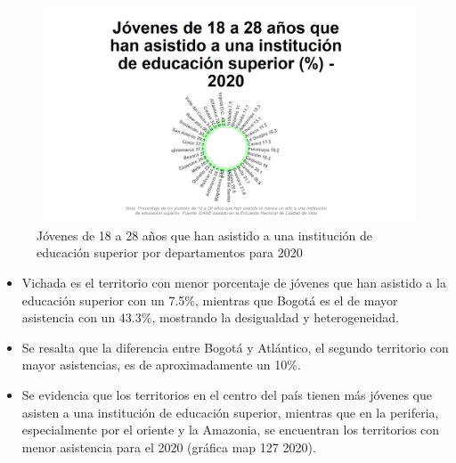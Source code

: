     \begin{figure}[H]
        \caption{Jóvenes de 18 a 28 años que han asistido a una institución de educación superior por departamentos para 2020 \label{map_result_2} }
        \begin{center}
        \includegraphics[width=\textwidth,keepaspectratio]{img/var_127_static.png}
        \end{center}
    \end{figure}
            \begin{itemize}
                \item Vichada es el territorio con menor porcentaje de jóvenes que han asistido a la educación superior con un 7.5\%, mientras que Bogotá es el de mayor asistencia con un 43.3\%, mostrando la desigualdad y heterogeneidad.
                \item Se resalta que la diferencia entre Bogotá y Atlántico, el segundo territorio con mayor asistencias, es de aproximadamente un 10\%.
                \item Se evidencia que los territorios en el centro del país tienen más jóvenes que asisten a una institución de educación superior, mientras que en la periferia, especialmente por el oriente y la Amazonia, se encuentran los territorios con menor asistencia para el 2020 (gráfica map 127 2020).
                \end{itemize}


